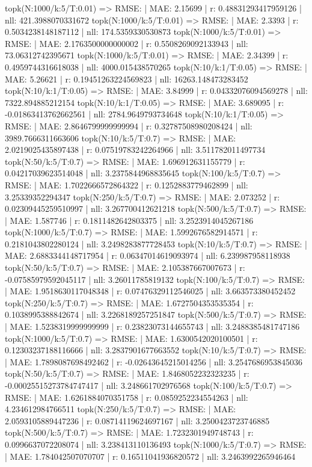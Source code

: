 topk(N:1000/k:5/T:0.01) => RMSE: | MAE: 2.15699 | r: 0.48831293417959126 | nll: 421.3988070331672
topk(N:1000/k:5/T:0.01) => RMSE: | MAE: 2.3393 | r: 0.5034238148187112 | nll: 174.5359330530873
topk(N:1000/k:5/T:0.01) => RMSE: | MAE: 2.1763500000000002 | r: 0.5508269092133943 | nll: 73.06312742395671
topk(N:1000/k:5/T:0.01) => RMSE: | MAE: 2.34399 | r: 0.4959744316618038 | nll: 4000.015438570265
topk(N:10/k:1/T:0.05) => RMSE: | MAE: 5.26621 | r: 0.19451263224569823 | nll: 16263.148473283452
topk(N:10/k:1/T:0.05) => RMSE: | MAE: 3.84999 | r: 0.04332076094569278 | nll: 7322.894885212154
topk(N:10/k:1/T:0.05) => RMSE: | MAE: 3.689095 | r: -0.01863413762662561 | nll: 2784.9649793734648
topk(N:10/k:1/T:0.05) => RMSE: | MAE: 2.8646799999999994 | r: 0.32787508980208424 | nll: 3989.7666311663606
topk(N:10/k:5/T:0.7) => RMSE: | MAE: 2.0219025435897438 | r: 0.07519783242264966 | nll: 3.511782011497734
topk(N:50/k:5/T:0.7) => RMSE: | MAE: 1.696912631155779 | r: 0.04217039623514048 | nll: 3.2375844968835645
topk(N:100/k:5/T:0.7) => RMSE: | MAE: 1.7022666572864322 | r: 0.1252883779462899 | nll: 3.25339352294347
topk(N:250/k:5/T:0.7) => RMSE: | MAE: 2.073252 | r: 0.02309445259510997 | nll: 3.267700412621218
topk(N:500/k:5/T:0.7) => RMSE: | MAE: 1.587746 | r: 0.1811482642803375 | nll: 3.2523914045267186
topk(N:1000/k:5/T:0.7) => RMSE: | MAE: 1.5992676582914571 | r: 0.2181043802280124 | nll: 3.2498283877728453
topk(N:10/k:5/T:0.7) => RMSE: | MAE: 2.6883344148717954 | r: 0.06347014619093974 | nll: 6.239987958118938
topk(N:50/k:5/T:0.7) => RMSE: | MAE: 2.105387667007673 | r: -0.07585979592045117 | nll: 3.26011785819132
topk(N:100/k:5/T:0.7) => RMSE: | MAE: 1.9518630117048348 | r: 0.07476329112546025 | nll: 3.663573380452452
topk(N:250/k:5/T:0.7) => RMSE: | MAE: 1.6727504353535354 | r: 0.1038995388842674 | nll: 3.2268189257251847
topk(N:500/k:5/T:0.7) => RMSE: | MAE: 1.5238319999999999 | r: 0.23823073144655743 | nll: 3.2488385481747186
topk(N:1000/k:5/T:0.7) => RMSE: | MAE: 1.6300542020100501 | r: 0.12303237188116666 | nll: 3.2837901677663552
topk(N:10/k:5/T:0.7) => RMSE: | MAE: 1.7898087698492462 | r: -0.02643645215014256 | nll: 3.2547686953845036
topk(N:50/k:5/T:0.7) => RMSE: | MAE: 1.8468052232323235 | r: -0.00025515273784747417 | nll: 3.248661702976568
topk(N:100/k:5/T:0.7) => RMSE: | MAE: 1.6261884070351758 | r: 0.0859252234554263 | nll: 4.234612984766511
topk(N:250/k:5/T:0.7) => RMSE: | MAE: 2.0593105889447236 | r: 0.08714119624697167 | nll: 3.2500423723746885
topk(N:500/k:5/T:0.7) => RMSE: | MAE: 1.7232301949748743 | r: 0.0996637072208074 | nll: 3.238413110136493
topk(N:1000/k:5/T:0.7) => RMSE: | MAE: 1.784042507070707 | r: 0.16511041936820572 | nll: 3.2463992265946464
